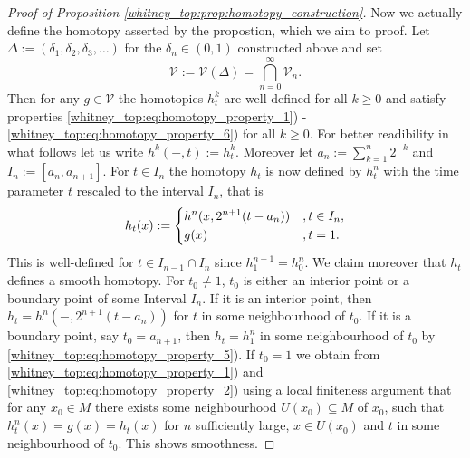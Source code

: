 \begin{proof}[Proof of Proposition \ref{whitney_top:prop:homotopy_construction}]
    Now we actually define the homotopy asserted by the propostion, which we aim to proof. Let $\Delta := (\delta_1,\delta_2,\delta_3,\ldots)$ for the $\delta_n \in (0,1)$ constructed above and set
    \[
    \mathcal{V} := \mathcal{V}(\Delta) = \bigcap_{n=0}^\infty  \mathcal{V}_n.
    \]
    Then for any $g \in \mathcal{V}$ the homotopies $h_t^k$ are well defined for all $k \geq 0$ and satisfy properties \ref{whitney_top:eq:homotopy_property_1}) - \ref{whitney_top:eq:homotopy_property_6}) for all $k \geq 0$. For better readibility in what follows let us write $h^k(-,t) := h_t^k$. Moreover let $a_n := \sum_{k=1}^n 2^{-k}$ and $I_n := \left[ a_n, a_{n+1}\right]$. For $t \in I_n$ the homotopy $h_t$ is now defined by $h_t^n$ with the time parameter $t$ rescaled to the interval $I_n$, that is 
    \[
    h_t(x):= \begin{dcases}
        h^n(x,2^{n+1}(t - a_n)) &, t \in I_n, \\
        g(x) &, t =1.
    \end{dcases}
    \] 
    This is well-defined for $t \in I_{n-1} \cap I_n$ since $h^{n-1}_1 = h^n_0$. We claim moreover that $h_t$ defines a smooth homotopy. For $t_0 \neq 1$, $t_0$ is either an interior point or a boundary point of some Interval $I_n$. If it is an interior point, then $h_t = h^n(-,2^{n+1}(t - a_n))$ for $t$ in some neighbourhood of $t_0$. If it is a boundary point, say $t_0 = a_{n+1}$, then $h_t = h^n_1$ in some neighbourhood of $t_0$ by \ref{whitney_top:eq:homotopy_property_5}). If $t_0 = 1$ we obtain from \ref{whitney_top:eq:homotopy_property_1}) and \ref{whitney_top:eq:homotopy_property_2}) using a local finiteness argument that for any $x_0 \in M$ there exists some neighbourhood $U(x_0) \subseteq M$ of $x_0$, such that $h_t^n(x) = g(x) = h_t(x)$ for $n$ sufficiently large, $x \in U(x_0)$ and $t$ in some neighbourhood of $t_0$. This shows smoothness. 


\end{proof}
